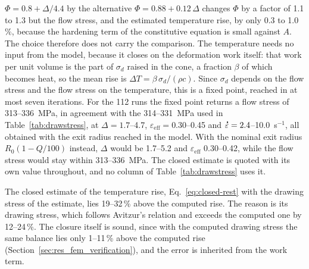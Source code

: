 \documentclass[subscriptcorrection,upint,varvw,barcolor=Goldenrod3,mathalfa=cal=euler,balance,hyphenate,french,pdf-a]{asmejour} %
\newcommand{\edot}{\accentset{\scalebox{0.4}{$\bullet$}}{\varepsilon}}
\begin{document}
$\Phi = 0.8+\Delta/4.4$ by the alternative $\Phi = 0.88+0.12\,\Delta$ changes $\Phi$ by a factor of
1.1 to 1.3 but the flow stress, and the estimated temperature rise, by only 0.3 to 1.0\,\%,
because the hardening term of the constitutive equation is small against $A$. The
choice therefore does not carry the comparison. The temperature
needs no input from the model, because it closes on the deformation work itself: that work per
unit volume is the part of $\sigma_d$ raised in the cone, a fraction $\beta$ of which becomes
heat, so the mean rise is $\Delta T = \beta\,\sigma_d/(\rho c)$. Since $\sigma_d$ depends on the
flow stress and the flow stress on the temperature, this is a fixed point, reached in at most
seven iterations. For the
112 runs the fixed point returns a flow stress of 313--336~MPa, in agreement with the
314--331~MPa used in Table~\ref{tab:drawstress}, at $\Delta = 1.7$--4.7,
$\varepsilon_{\mathrm{eff}} = 0.30$--0.45 and $\edot = 2.4$--10.0~s$^{-1}$, all obtained with the exit
radius reached in the model. With the nominal exit radius $R_0(1-Q/100)$ instead, $\Delta$ would be
1.7--5.2 and $\varepsilon_{\mathrm{eff}}$ 0.30--0.42, while the flow stress would stay within
313--336~MPa.
The closed
estimate is quoted with its own value throughout, and no column of Table~\ref{tab:drawstress}
uses it.

The closed estimate of the temperature rise, Eq.~\eqref{eq:closed-rest} with the drawing stress
of the estimate, lies 19--32\,\% above the computed rise. The reason is its drawing stress, which
follows Avitzur's relation and exceeds the computed one by 12--24\,\%. The closure itself is sound,
since with the computed drawing stress the same balance lies only 1--11\,\% above the computed
rise (Section~\ref{sec:res_fem_verification}), and the error is inherited from the work term.
\end{document}
